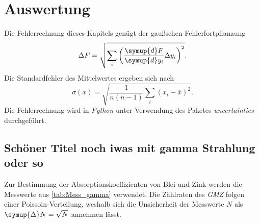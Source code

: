 \section{Auswertung}
\label{sec:Auswertung}
Die Fehlerrechnung dieses Kapitels genügt der gaußschen Fehlerfortpflanzung
\begin{equation*}
  \label{eqn:Gauss}
  \Delta F = \sqrt{\sum_i\left(\frac{\symup{d}F}{\symup{d}y_i}\Delta y_i \right)^2}.
\end{equation*}
Die Standardfehler des Mittelwertes ergeben sich nach
\begin{equation*}
  \label{eqn:MW-Fehler}
  \sigma(x) = \sqrt{\frac{1}{n(n-1)} \sum_i (x_i - \overline{x})^2}.
\end{equation*}
Die Fehlerrechnung wird in \textit{Python} unter Verwendung des Paketes \textit{uncertainties} \cite{uncertainties} durchgeführt.

\subsection{Schöner Titel noch iwas mit gamma Strahlung oder so}
Zur Bestimmung der Absorptionskoeffizienten von Blei und Zink werden die Messwerte aus \autoref{tab:Mess_gamma} verwendet. Die Zählraten des \textit{GMZ} folgen einer
Poissoin-Verteilung, weshalb sich die Unsicherheit der Messwerte $N$ als $\symup{\Delta}N = \sqrt{N}$ annehmen lässt.

